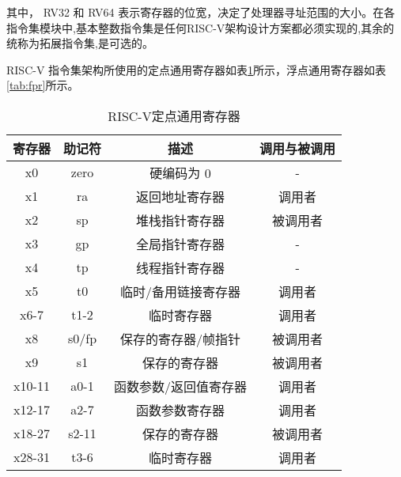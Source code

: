 其中， RV32 和 RV64 表示寄存器的位宽，决定了处理器寻址范围的大小。在各指令集模块中,基本整数指令集是任何RISC-V架构设计方案都必须实现的,其余的统称为拓展指令集,是可选的。


RISC-V 指令集架构所使用的定点通用寄存器如表\ref{tab:xpr}所示，浮点通用寄存器如表\ref{tab:fpr}所示。
\begin{table}[H]
  \centering
  \caption{RISC-V定点通用寄存器}
  \label{tab:xpr}
  \begin{tabular}{cccc}
    \toprule
寄存器 &	助记符	& 描述 &	调用与被调用\\
    \midrule
    x0 & zero & 硬编码为 0 & -\\
    x1 & ra & 返回地址寄存器 & 调用者\\
    x2 & sp & 堆栈指针寄存器 & 被调用者\\
    x3 & gp & 全局指针寄存器 & -\\
    x4 & tp & 线程指针寄存器 & -\\
    x5 & t0 & 临时/备用链接寄存器 & 调用者\\
    x6-7 & t1-2 & 临时寄存器 & 调用者\\
    x8 & s0/fp & 保存的寄存器/帧指针 & 被调用者\\
    x9 & s1 & 保存的寄存器 & 被调用者\\
    x10-11 & a0-1 & 函数参数/返回值寄存器 & 调用者\\
    x12-17 & a2-7 & 函数参数寄存器 & 调用者\\
    x18-27 & s2-11 & 保存的寄存器 & 被调用者\\
    x28-31	& t3-6 & 临时寄存器 & 调用者\\
    \bottomrule
  \end{tabular}
\end{table}


